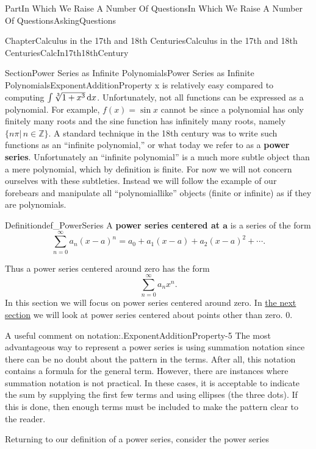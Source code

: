 \documentclass[oneside,10pt,]{book}
\newcommand{\terminology}[1]{\textbf{#1}}
\numberwithin{equation}{part}
\newcommand{\dx}[1]{\,{\rm d}#1}
\newcommand{\ZZ}{\mathbb {Z}}
\begin{document}
\begin{partptx}{Part}{In Which We Raise A Number Of Questions}{}{In Which We Raise A Number Of Questions}{}{}{AskingQuestions}
\begin{chapterptx}{Chapter}{Calculus in the 17th and 18th Centuries}{}{Calculus in the 17th and 18th Centuries}{}{}{CalcIn17th18thCentury}
\begin{sectionptx}{Section}{Power Series as Infinite Polynomials}{}{Power Series as Infinite Polynomials}{}{}{ExponentAdditionProperty}
{x}\) is relatively easy compared to computing \(\int\sqrt[3]{1+x^3}\dx{ x}\).  Unfortunately, not all functions can be expressed as a polynomial.  For example, \(f(x)=\sin x\) cannot be since a polynomial has only finitely many roots and the sine function has infinitely many roots, namely \(\{n\pi|\,n\in\ZZ\}\).  A standard technique in the 18th century was to write such functions as an ``infinite polynomial,'' or what today we refer to as a \terminology{power series}.  Unfortunately an ``infinite polynomial'' is a much more subtle object than a mere polynomial, which by definition is finite.  For now we will not concern ourselves with these subtleties. Instead we will follow the example of our forebears and manipulate all ``polynomial\textendash{}like'' objects (finite or infinite) as if they are polynomials.%
\begin{definition}{Definition}{}{def_PowerSeries}%
%
%
A \terminology{power series centered at \(\boldsymbol{a}\)} is a series of the form%
\begin{equation*}
\sum_{n=0}^\infty a_n(x-a)^n=a_0+a_1(x-a)+a_2(x-a)^2+\cdots\text{.}
\end{equation*}
%
\end{definition}
Thus a power series centered around zero has the form%
\begin{equation*}
\sum_{n=0}^\infty a_nx^n \text{.}
\end{equation*}
In this section we will focus on power series centered around zero. In \hyperref[SECTIONPowSerWOTaylor]{the next section} we will look at power series centered about points other than zero. \(0\).%
\begin{paragraphs}{A useful comment on notation:.}{ExponentAdditionProperty-5}%
The most advantageous way to represent a power series is using summation notation since there can be no doubt about the pattern in the terms.  After all, this notation contains a formula for the general term.  However, there are instances where summation notation is not practical.  In these cases, it is acceptable to indicate the sum by supplying the first few terms and using ellipses (the three dots).  If this is done, then enough terms must be included to make the pattern clear to the reader.%
\end{paragraphs}%
\par\medskip
{} Returning to our definition of a power series, consider the power series%
\begin{equation*}

\end{equation*}
\end{sectionptx}
\end{chapterptx}
\end{partptx}
\end{document}
